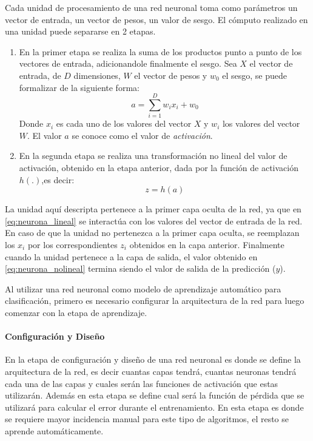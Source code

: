 \documentclass[a4paper,11pt,spanish]{book}
\begin{document}
	Cada unidad de procesamiento de una red neuronal toma como parámetros un vector de entrada, un vector de pesos, un valor de sesgo. 
	El cómputo realizado en una unidad puede separarse en 2 etapas.
	\begin{enumerate}
	  \item En la primer etapa se realiza la suma de los productos punto a punto de los vectores de entrada, adicionandole finalmente el sesgo.
	    Sea $X$ el vector de entrada, de $D$ dimensiones, $W$ el vector de pesos y $w_0$ el sesgo, se puede formalizar de la siguiente forma:
	    \begin{equation} \label{eq:neurona_lineal}
	      a = \sum_{i=1}^{D} w_{i} x_i + w_{0}
	    \end{equation}
	    Donde $x_i$ es cada uno de los valores del vector $X$ y $w_{i}$ los valores del vector $W$. El valor $a$ se conoce como el valor de \emph{activación}.
	  \item En la segunda etapa se realiza una transformación no lineal del valor de activación, obtenido en la etapa anterior, dada por la función de activación $h(.)$,es decir:
	    \begin{equation}\label{eq:neurona_nolineal}
	      z = h(a)
	    \end{equation}
	\end{enumerate}
	La unidad aquí descripta pertenece a la primer capa oculta de la red, ya que en \eqref{eq:neurona_lineal} se interactúa	con los valores del vector de entrada 
	de la red. 
	En caso de que la unidad no pertenezca a la primer capa oculta, se reemplazan los $x_i$ por los correspondientes $z_i$ obtenidos en la capa anterior. 
	Finalmente cuando la unidad pertenece a la capa de salida, el valor obtenido en \eqref{eq:neurona_nolineal} termina siendo el valor de salida de la predicción ($y$).
	
	Al utilizar una red neuronal como modelo de aprendizaje automático para clasificación, primero es necesario configurar la arquitectura de la red para luego comenzar 
	con la etapa de aprendizaje.

      \paragraph{Configuración y Diseño}
	En la etapa de configuración y diseño de una red neuronal es donde se define la arquitectura de la red, es decir cuantas capas tendrá, cuantas neuronas tendrá 
	cada una de las capas y cuales serán las funciones de activación que estas utilizarán.
	Además en esta etapa se define cual será la función de pérdida que se utilizará para calcular el error durante el entrenamiento.
	En esta etapa es donde se requiere mayor incidencia manual para este tipo de algoritmos, el resto se aprende automáticamente.
\end{document}
